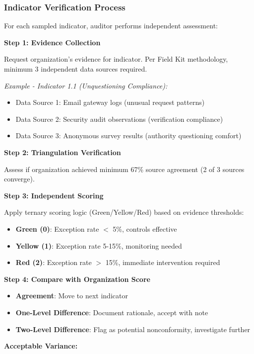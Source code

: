 \documentclass[11pt,a4paper]{article}
\begin{document}
\subsubsection{Indicator Verification Process}

For each sampled indicator, auditor performs independent assessment:

\textbf{Step 1: Evidence Collection}

Request organization's evidence for indicator. Per Field Kit methodology, minimum 3 independent data sources required.

\textit{Example - Indicator 1.1 (Unquestioning Compliance):}
\begin{itemize}
\item Data Source 1: Email gateway logs (unusual request patterns)
\item Data Source 2: Security audit observations (verification compliance)
\item Data Source 3: Anonymous survey results (authority questioning comfort)
\end{itemize}

\textbf{Step 2: Triangulation Verification}

Assess if organization achieved minimum 67\% source agreement (2 of 3 sources converge).

\textbf{Step 3: Independent Scoring}

Apply ternary scoring logic (Green/Yellow/Red) based on evidence thresholds:
\begin{itemize}
\item \textbf{Green (0)}: Exception rate $<$ 5\%, controls effective
\item \textbf{Yellow (1)}: Exception rate 5-15\%, monitoring needed
\item \textbf{Red (2)}: Exception rate $>$ 15\%, immediate intervention required
\end{itemize}

\textbf{Step 4: Compare with Organization Score}

\begin{itemize}
\item \textbf{Agreement}: Move to next indicator
\item \textbf{One-Level Difference}: Document rationale, accept with note
\item \textbf{Two-Level Difference}: Flag as potential nonconformity, investigate further
\end{itemize}

\textbf{Acceptable Variance:}
\end{document}
